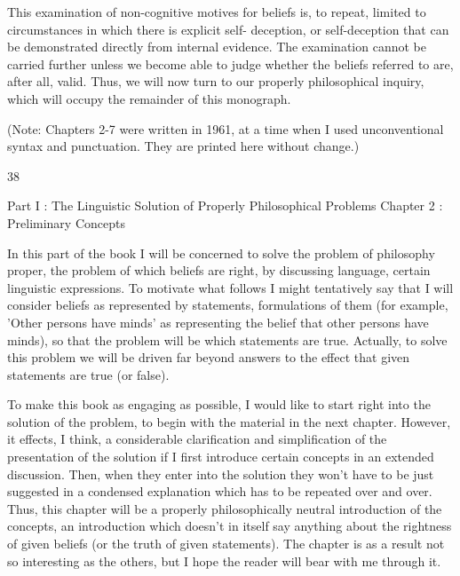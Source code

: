 \documentclass[10pt,twoside]{memoir}
\begin{document}
\begin{enumerate}
{{{{{This examination of non-cognitive motives for beliefs is, to repeat, 
limited to circumstances in which there is explicit self- deception, or 
self-deception that can be demonstrated directly from internal evidence. The 
examination cannot be carried further unless we become able to judge 
whether the beliefs referred to are, after all, valid. Thus, we will now turn to 
our properly philosophical inquiry, which will occupy the remainder of this 
monograph. 


(Note: Chapters 2-7 were written in 1961, at a time when I used 
unconventional syntax and punctuation. They are printed here without 
change.) 


38 


Part I : The Linguistic Solution of Properly Philosophical Problems 
Chapter 2 : Preliminary Concepts 


In this part of the book I will be concerned to solve the problem of 
philosophy proper, the problem of which beliefs are right, by discussing 
language, certain linguistic expressions. To motivate what follows I might 
tentatively say that I will consider beliefs as represented by statements, 
formulations of them (for example, 'Other persons have minds' as 
representing the belief that other persons have minds), so that the problem 
will be which statements are true. Actually, to solve this problem we will be 
driven far beyond answers to the effect that given statements are true (or 
false). 

To make this book as engaging as possible, I would like to start right 
into the solution of the problem, to begin with the material in the next 
chapter. However, it effects, I think, a considerable clarification and 
simplification of the presentation of the solution if I first introduce certain 
concepts in an extended discussion. Then, when they enter into the solution 
they won't have to be just suggested in a condensed explanation which has 
to be repeated over and over. Thus, this chapter will be a properly 
philosophically neutral introduction of the concepts, an introduction which 
doesn't in itself say anything about the rightness of given beliefs (or the 
truth of given statements). The chapter is as a result not so interesting as the 
others, but I hope the reader will bear with me through it. 

}}}}}
\end{enumerate}
\end{document}
